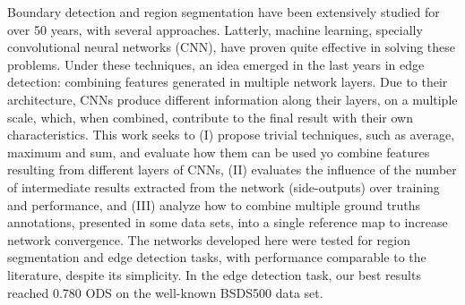 Boundary detection and region segmentation have been extensively studied for over 50 years, with several approaches.
Latterly, machine learning, specially convolutional neural networks (CNN), have proven quite effective in solving these problems.
Under these techniques, an idea emerged in the last years in edge detection: combining features generated in multiple network layers.
Due to their architecture, CNNs produce different information along their layers, on a multiple scale, which, when combined, contribute to the final result with their own characteristics.
This work seeks to (I) propose trivial techniques, such as average, maximum and sum, and evaluate how them can be used yo combine features resulting from different layers of CNNs, (II) evaluates the influence of the number of intermediate results extracted from the network (side-outputs) over training and performance, and (III) analyze how to combine multiple ground truths annotations, presented in some data sets, into a single reference map to increase network convergence.
The networks developed here were tested for region segmentation and edge detection tasks, with performance comparable to the literature, despite its simplicity.
In the edge detection task, our best results reached 0.780 ODS on the well-known BSDS500 data set. %
